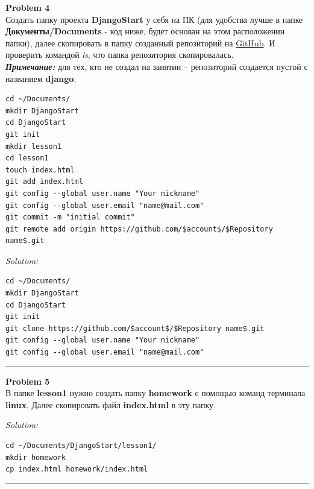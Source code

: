 \documentclass[a4paper, 11pt]{extarticle}
\newenvironment{problem}[2][Problem]
    { \begin{mdframed}[backgroundcolor=gray!20] \textbf{#1 #2} \\}
    {  \end{mdframed}}
\newenvironment{solution}
    {\textit{Solution:}}
    {}
\begin{document}
\begin{problem}{4}
Создать папку проекта \textbf{DjangoStart} у себя на ПК (для удобства лучше в папке \textbf{Документы/Documents} - код ниже, будет основан на этом расположении папки), далее скопировать в папку созданный репозиторий на \href{https://github.com/}{GitHub}. И проверить командой \textit{ls}, что папка репозитория скопировалась.\\
\textit{\textbf{Примечание: }} для тех, кто не создал на занятии -- репозиторий создается пустой с названием \textbf{django}. 
\begin{lstlisting}
cd ~/Documents/
mkdir DjangoStart
cd DjangoStart
git init
mkdir lesson1
cd lesson1
touch index.html
git add index.html
git config --global user.name "Your nickname"
git config --global user.email "name@mail.com"
git commit -m "initial commit"
git remote add origin https://github.com/$account$/$Repository name$.git
\end{lstlisting}
\end{problem}
\begin{solution}
\begin{lstlisting}
cd ~/Documents/
mkdir DjangoStart
cd DjangoStart
git init
git clone https://github.com/$account$/$Repository name$.git
git config --global user.name "Your nickname"
git config --global user.email "name@mail.com"
\end{lstlisting}
\end{solution} 
\noindent\rule{6.257in}{2.8pt}



\begin{problem}{5}
В папке \textbf{lesson1} нужно создать папку \textbf{homework} с помощью команд терминала \textbf{linux}. Далее скопировать файл \textbf{index.html} в эту папку.
\end{problem}
\begin{solution}
\begin{lstlisting}
cd ~/Documents/DjangoStart/lesson1/
mkdir homework
cp index.html homework/index.html
\end{lstlisting}
\end{solution} 
\noindent\rule{6.257in}{2.8pt}
\end{document}
